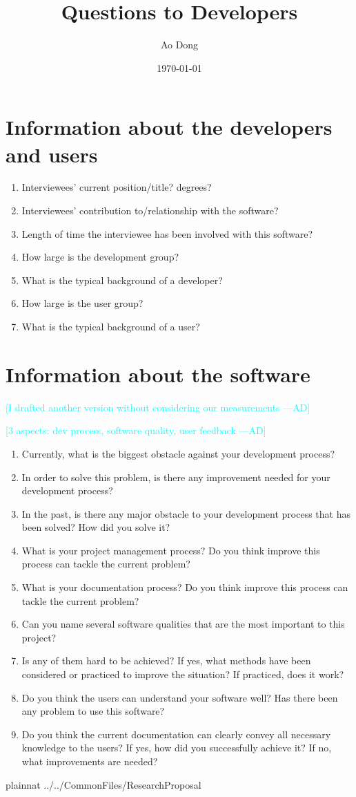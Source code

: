 \documentclass[12pt]{article}
\title{Questions to Developers}
\author{Ao Dong}
\date{\today}
\newcommand{\authornote}[3]{\textcolor{#1}{[#3 ---#2]}}
\newcommand{\authornote}[3]{}
\newcommand{\ad}[1]{\authornote{cyan}{AD}{#1}} %
\begin{document}
\maketitle

\section{Information about the developers and users}\citep{Jegatheesan2016}
\begin{enumerate}
\item Interviewees' current position/title? degrees?
\item Interviewees' contribution to/relationship with the software?
\item Length of time the interviewee has been involved with this software?
\item How large is the development group?
\item What is the typical background of a developer?
\item How large is the user group?
\item What is the typical background of a user?
\end{enumerate}

\section{Information about the software}

\ad{I drafted another version without considering our measurements}

\noindent\ad{3 aspects: dev process, software quality, user feedback}

\begin{enumerate}
\item Currently, what is the biggest obstacle against your development process?
\item In order to solve this problem, is there any improvement needed for your
development process?
\item In the past, is there any major obstacle to your development process that
has been solved? How did you solve it?
\item What is your project management process? Do you think improve this process
can tackle the current problem?
\item What is your documentation process? Do you think improve this process can
tackle the current problem?
\item Can you name several software qualities that are the most important to
this project?
\item Is any of them hard to be achieved? If yes, what methods have been considered
or practiced to improve the situation? If practiced, does it work?
\item Do you think the users can understand your software well? Has there been
any problem to use this software?
\item Do you think the current documentation can clearly convey all necessary
knowledge to the users? If yes, how did you successfully achieve it? If no, what
improvements are needed?
\end{enumerate}

\newpage

 {plainnat}
 {../../CommonFiles/ResearchProposal}
\end{document}
